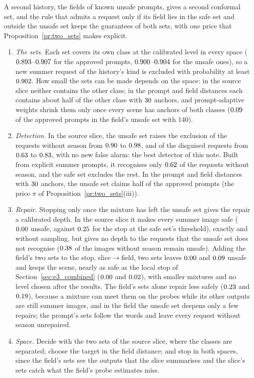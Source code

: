 \documentclass{article}
\theoremstyle{plain}
\theoremstyle{remark}
\begin{document}
A second history, the fields of known unsafe prompts, gives a second conformal set, and the rule that admits a request only if its field
lies in the safe set and outside the unsafe set keeps the guarantees of both sets, with one price that Proposition~\ref{pr:two_sets}
makes explicit.
\begin{enumerate}[label=(Q\arabic*)]
\item \emph{The sets.} Each set covers its own class at the calibrated level in every space ($0.893$--$0.907$ for the approved
prompts, $0.900$--$0.904$ for the unsafe ones), so a new summer request of the history's kind is excluded with probability
at least $0.902$. How small the sets can be made depends on the space: in the source slice neither contains the other class; in the
prompt and field distances each contains about half of the other class with $30$ anchors, and prompt-adaptive weights shrink them
only once every scene has anchors of both classes ($0.09$ of the approved prompts in the field's unsafe set with $140$).
\item \emph{Detection.} In the source slice, the unsafe set raises the exclusion of the requests without season from $0.90$ to
$0.98$, and of the disguised requests from $0.63$ to $0.83$, with no new false alarm: the best detector of this
note. Built from explicit summer prompts, it recognises only $0.62$ of the requests without season, and the safe set excludes the
rest. In the prompt and field distances with $30$ anchors, the unsafe set claims half of the approved prompts (the price $\pi$ of
Proposition~\ref{pr:two_sets}(iii)).
\item \emph{Repair.} Stopping only once the mixture has left the unsafe set gives the repair a calibrated depth. In the source slice it
makes every summer image safe ($0.00$ unsafe, against $0.25$ for the stop at the safe set's threshold), exactly
and without sampling, but gives no depth to the requests that the unsafe set does not recognise ($0.38$ of the images without
season remain unsafe). Adding the field's two sets to the stop, slice$\to$field, two sets leaves $0.00$ and
$0.09$ unsafe and keeps the scene, nearly as safe as the local stop of Section~\ref{sec:e3_combined}
($0.00$ and $0.02$), with smaller mixtures and no level chosen after the results.
The field's sets alone repair less safely ($0.23$ and $0.19$), because a mixture can meet them on the probes
while its other outputs are still summer images, and in the field the unsafe set deepens only a few repairs; the prompt's sets follow the
words and leave every request without season unrepaired.
\item \emph{Space.} Decide with the two sets of the source slice, where the classes are separated; choose the target in the field
distance; and stop in both spaces, since the field's sets see the outputs that the slice summarises and the slice's sets catch what the
field's probe estimates miss.
\end{enumerate}
\end{document}

